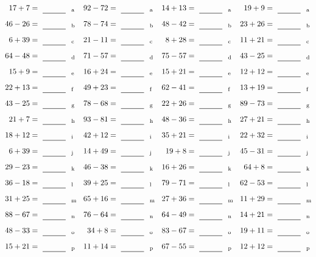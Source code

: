 \documentclass
[
  draft    = true,
  fontsize = 11pt,
  parskip  = half-
]
{scrartcl}
\begin{document}
\clearpage
\begin{align*}
    \pline{17+7}&=\rline{a}
  & \pline{92-72}&=\rline{a}
  & \pline{14+13}&=\rline{a}
  & \pline{19+9}&=\rline{a} \\[1ex]
    \pline{46-26}&=\rline{b}
  & \pline{78-74}&=\rline{b}
  & \pline{48-42}&=\rline{b}
  & \pline{23+26}&=\rline{b} \\[1ex]
    \pline{6+39}&=\rline{c}
  & \pline{21-11}&=\rline{c}
  & \pline{8+28}&=\rline{c}
  & \pline{11+21}&=\rline{c} \\[1ex]
    \pline{64-48}&=\rline{d}
  & \pline{71-57}&=\rline{d}
  & \pline{75-57}&=\rline{d}
  & \pline{43-25}&=\rline{d} \\[1ex]
    \pline{15+9}&=\rline{e}
  & \pline{16+24}&=\rline{e}
  & \pline{15+21}&=\rline{e}
  & \pline{12+12}&=\rline{e} \\[1ex]
    \pline{22+13}&=\rline{f}
  & \pline{49+23}&=\rline{f}
  & \pline{62-41}&=\rline{f}
  & \pline{13+19}&=\rline{f} \\[1ex]
    \pline{43-25}&=\rline{g}
  & \pline{78-68}&=\rline{g}
  & \pline{22+26}&=\rline{g}
  & \pline{89-73}&=\rline{g} \\[1ex]
    \pline{21+7}&=\rline{h}
  & \pline{93-81}&=\rline{h}
  & \pline{48-36}&=\rline{h}
  & \pline{27+21}&=\rline{h} \\[1ex]
    \pline{18+12}&=\rline{i}
  & \pline{42+12}&=\rline{i}
  & \pline{35+21}&=\rline{i}
  & \pline{22+32}&=\rline{i} \\[1ex]
    \pline{6+39}&=\rline{j}
  & \pline{14+49}&=\rline{j}
  & \pline{19+8}&=\rline{j}
  & \pline{45-31}&=\rline{j} \\[1ex]
    \pline{29-23}&=\rline{k}
  & \pline{46-38}&=\rline{k}
  & \pline{16+26}&=\rline{k}
  & \pline{64+8}&=\rline{k} \\[1ex]
    \pline{36-18}&=\rline{l}
  & \pline{39+25}&=\rline{l}
  & \pline{79-71}&=\rline{l}
  & \pline{62-53}&=\rline{l} \\[1ex]
    \pline{31+25}&=\rline{m}
  & \pline{65+16}&=\rline{m}
  & \pline{27+36}&=\rline{m}
  & \pline{11+29}&=\rline{m} \\[1ex]
    \pline{88-67}&=\rline{n}
  & \pline{76-64}&=\rline{n}
  & \pline{64-49}&=\rline{n}
  & \pline{14+21}&=\rline{n} \\[1ex]
    \pline{48-33}&=\rline{o}
  & \pline{34+8}&=\rline{o}
  & \pline{83-67}&=\rline{o}
  & \pline{19+11}&=\rline{o} \\[1ex]
    \pline{15+21}&=\rline{p}
  & \pline{11+14}&=\rline{p}
  & \pline{67-55}&=\rline{p}
  & \pline{12+12}&=\rline{p}
\end{align*}
\end{document}
